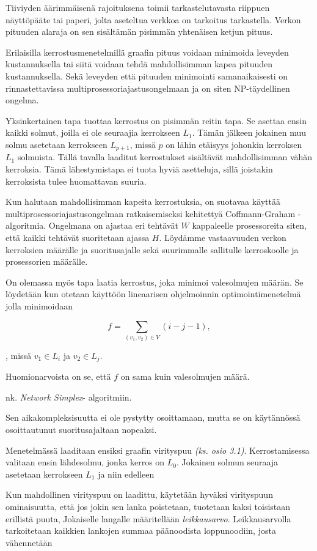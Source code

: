 \documentclass[finnish,12pt]{article}
\begin{document}
Tiiviyden äärimmäisenä rajoituksena toimii tarkastelutavasta riippuen näyttöpääte tai paperi, jolta aseteltua verkkoa on tarkoitus tarkastella.
Verkon pituuden alaraja on sen sisältämän pisimmän yhtenäisen ketjun pituus.

Erilaisilla kerrostusmenetelmillä graafin pituus voidaan minimoida leveyden kustannuksella tai siitä voidaan tehdä mahdollisimman kapea pituuden kustannuksella.
Sekä leveyden että pituuden minimointi samanaikaisesti on rinnastettavissa multiprosessoriajastusongelmaan ja on siten NP-täydellinen ongelma. \cite{RefWorks:39}

Yksinkertainen tapa tuottaa kerrostus on pisimmän reitin tapa. Se asettaa ensin kaikki solmut, joilla ei ole seuraajia kerrokseen $L_1$.
Tämän jälkeen jokainen muu solmu asetetaan kerrokseen $L_{p+1}$, missä $p$ on lähin etäisyys johonkin kerroksen $L_1$ solmuista.
Tällä tavalla laaditut kerrostukset sisältävät mahdollisimman vähän kerroksia.
Tämä lähestymistapa ei tuota hyviä asetteluja, sillä joistakin kerroksista tulee huomattavan suuria.

Kun halutaan mahdollisimman kapeita kerrostuksia, on suotavaa käyttää multiprosessoriajastusongelman ratkaisemiseksi kehitettyä Coffmann-Graham -algoritmia. \cite{RefWorks:59}
Ongelmana on ajastaa eri tehtävät $W$ kappaleelle prosessoreita siten, että kaikki tehtävät suoritetaan ajassa $H$.
Löydämme vastaavuuden verkon kerroksien määrälle ja suoritusajalle sekä suurimmalle sallitulle kerroskoolle ja prosessorien määrälle.

On olemassa myös tapa laatia kerrostus, joka minimoi valesolmujen määrän.
Se löydetään kun otetaan käyttöön lineaarisen ohjelmoinnin optimointimenetelmä jolla minimoidaan

$$f=\displaystyle\sum\limits_{(v_1,v_2) \in V} (i - j - 1),$$

, missä $v_1 \in L_i$ ja $v_2 \in L_j$.

Huomionarvoista on se, että $f$ on sama kuin valesolmujen määrä.

 nk. \emph{Network Simplex}- algoritmiin.

Sen aikakompleksisuutta ei ole pystytty osoittamaan, mutta se on käytännössä osoittautunut suoritusajaltaan nopeaksi.

Menetelmässä laaditaan ensiksi graafin virityspuu \emph{(ks. osio 3.1)}.
Kerrostamisessa valitaan ensin lähdesolmu, jonka kerros on $L_0$.
Jokainen solmun seuraaja asetetaan kerrokseen $L_1$ ja niin edelleen

Kun mahdollinen virityspuu on laadittu, käytetään hyväksi virityspuun ominaisuutta, että jos jokin sen lanka poistetaan, tuotetaan kaksi toisistaan erillistä puuta,
Jokaiselle langalle määritellään \emph{leikkausarvo}.
Leikkausarvolla tarkoitetaan kaikkien lankojen summaa päänoodista loppunoodiin, josta vähennetään 
\end{document}
